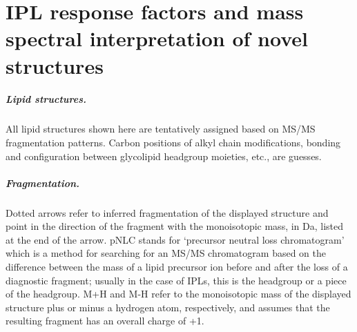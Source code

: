 \chapter{IPL response factors and mass spectral interpretation of novel structures}\label{app1}

\paragraph*{Lipid structures.} All lipid structures shown here are tentatively assigned based on MS/MS fragmentation patterns. Carbon positions of alkyl chain modifications, bonding and configuration between glycolipid headgroup moieties, etc., are guesses.\newline

\paragraph*{Fragmentation.} Dotted arrows refer to inferred fragmentation of the displayed structure and point in the direction of the fragment with the monoisotopic mass, in Da, listed at the end of the arrow. pNLC stands for `precursor neutral loss chromatogram' which is a method for searching for an MS/MS chromatogram based on the difference between the mass of a lipid precursor ion before and after the loss of a diagnostic fragment; usually in the case of IPLs, this is the headgroup or a piece of the headgroup. M+H and M-H refer to the monoisotopic mass of the displayed structure plus or minus a hydrogen atom, respectively, and assumes that the resulting fragment has an overall charge of +1.

\clearpage

